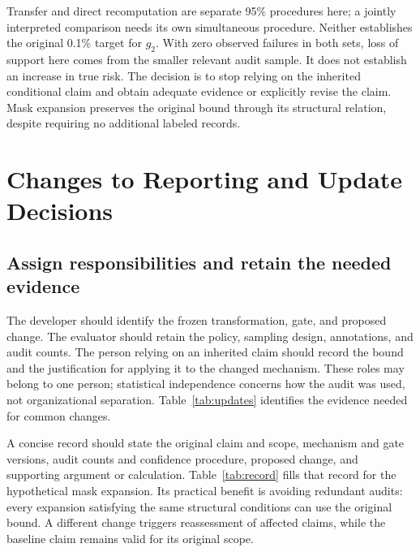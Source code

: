 \documentclass[conference]{IEEEtran}
\begin{document}
Transfer and direct recomputation are separate 95\% procedures here; a jointly interpreted comparison needs its own simultaneous procedure. Neither establishes the original 0.1\% target for $g_2$. With zero observed failures in both sets, loss of support here comes from the smaller relevant audit sample. It does not establish an increase in true risk. The decision is to stop relying on the inherited conditional claim and obtain adequate evidence or explicitly revise the claim. Mask expansion preserves the original bound through its structural relation, despite requiring no additional labeled records.

\section{Changes to Reporting and Update Decisions}
\label{sec:practice}
\subsection{Assign responsibilities and retain the needed evidence}
The developer should identify the frozen transformation, gate, and proposed change. The evaluator should retain the policy, sampling design, annotations, and audit counts. The person relying on an inherited claim should record the bound and the justification for applying it to the changed mechanism. These roles may belong to one person; statistical independence concerns how the audit was used, not organizational separation. Table~\ref{tab:updates} identifies the evidence needed for common changes.

A concise record should state the original claim and scope, mechanism and gate versions, audit counts and confidence procedure, proposed change, and supporting argument or calculation. Table~\ref{tab:record} fills that record for the hypothetical mask expansion. Its practical benefit is avoiding redundant audits: every expansion satisfying the same structural conditions can use the original bound. A different change triggers reassessment of affected claims, while the baseline claim remains valid for its original scope.
\end{document}
